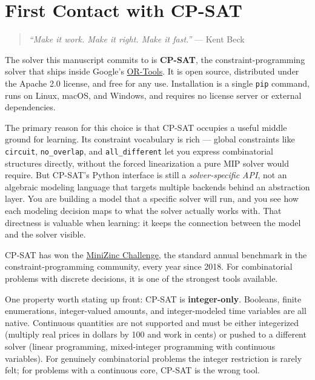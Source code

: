 \chapter{First Contact with CP-SAT}\label{chap:5}

\begin{quote}
\emph{``Make it work. Make it right. Make it fast.''} --- Kent Beck
\end{quote}

The solver this manuscript commits to is \textbf{CP-SAT}, the
constraint-programming solver that ships inside Google's
\href{https://developers.google.com/optimization}{OR-Tools}. It is open
source, distributed under the Apache 2.0 license, and free for any use.
Installation is a single \lstinline!pip! command, runs on
Linux, macOS, and Windows, and requires no license server or external
dependencies.

The primary reason for this choice is that CP-SAT occupies a useful
middle ground for learning. Its constraint vocabulary is rich --- global
constraints like \lstinline!circuit!,
\lstinline!no_overlap!, and
\lstinline!all_different! let you express combinatorial
structures directly, without the forced linearization a pure MIP solver
would require. But CP-SAT's Python interface is still a
\emph{solver-specific API}, not an algebraic modeling language that
targets multiple backends behind an abstraction layer. You are building
a model that a specific solver will run, and you see how each modeling
decision maps to what the solver actually works with. That directness is
valuable when learning: it keeps the connection between the model and
the solver visible.

CP-SAT has won the \href{https://www.minizinc.org/challenge/}{MiniZinc
Challenge}, the standard annual benchmark in the
constraint-programming community, every year since 2018. For
combinatorial problems with discrete decisions, it is one of the
strongest tools available.

One property worth stating up front: CP-SAT is \textbf{integer-only}.
Booleans, finite enumerations, integer-valued amounts, and
integer-modeled time variables are all native. Continuous quantities are
not supported and must be either integerized (multiply real prices in
dollars by 100 and work in cents) or pushed to a different solver
(linear programming, mixed-integer programming with continuous
variables). For genuinely combinatorial problems the integer restriction
is rarely felt; for problems with a continuous core, CP-SAT is the wrong
tool.

